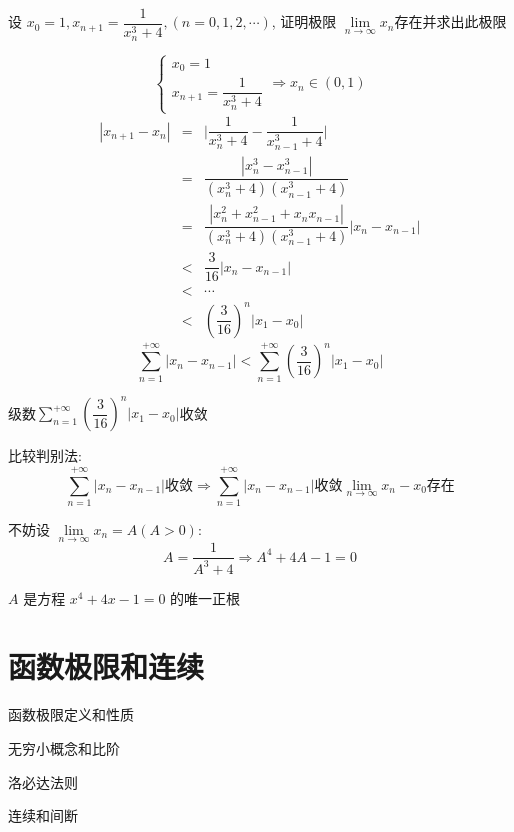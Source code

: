\begin{proposition}
	设 $x_{0}=1,x_{n+1}=\dfrac{1}{x_{n}^3+4},(n=0,1,2,\cdots)$, 证明极限 $\lim\limits_{n\to\infty}x_{n}$存在并求出此极限
\end{proposition}
\begin{solution}
	
	$$\begin{cases}
		x_{0} = 1\\
		x_{n+1} = \dfrac{1}{x_{n}^{3}+4}
	\end{cases} \Rightarrow x_{n}\in(0,1)$$
	\begin{eqnarray*}
		|x_{n+1}-x_{n}| & = & \big|\dfrac{1}{x_{n}^3+4}-\dfrac{1}{x_{n-1}^3+4}\big| \\
						& = & \dfrac{|x_{n}^{3}-x_{n-1}^{3}|}{(x_{n}^3+4)(x_{n-1}^3+4)} \\
						& = & \dfrac{|x_{n}^{2}+x_{n-1}^{2}+x_{n}x_{n-1}|}{(x_{n}^3+4)(x_{n-1}^3+4)}|x_{n}-x_{n-1}| \\
						& < & \dfrac{3}{16}|x_{n}-x_{n-1}|\\
						& < & \cdots\\
						& < & (\dfrac{3}{16})^{n}|x_{1}-x_{0}|
	\end{eqnarray*}
	$$\sum\limits_{n=1}^{+\infty}|x_{n}-x_{n-1}| < \sum\limits_{n=1}^{+\infty} (\dfrac{3}{16})^{n}|x_{1}-x_{0}|$$
	
	级数$\sum\limits_{n=1}^{+\infty}(\dfrac{3}{16})^{n}|x_{1}-x_{0}|$收敛
	
	比较判别法: 
	$$\sum\limits_{n=1}^{+\infty}|x_{n}-x_{n-1}|\text{收敛}\Rightarrow \sum\limits_{n=1}^{+\infty}|x_{n}-x_{n-1}|\text{收敛}
	\lim\limits_{n\to\infty}x_{n}-x_{0}\text{存在}$$
	
	不妨设 $\lim\limits_{n\to\infty}x_{n}=A(A>0)$: 
	$$A=\dfrac{1}{A^3+4}\Rightarrow A^4+4A-1=0$$
	
	$A$ 是方程 $x^4+4x-1=0$ 的唯一正根
\end{solution}

\chapter{函数极限和连续}
\begin{introduction}
	\item 函数极限定义和性质
	\item 无穷小概念和比阶
	\item 洛必达法则
	\item 连续和间断
\end{introduction}

